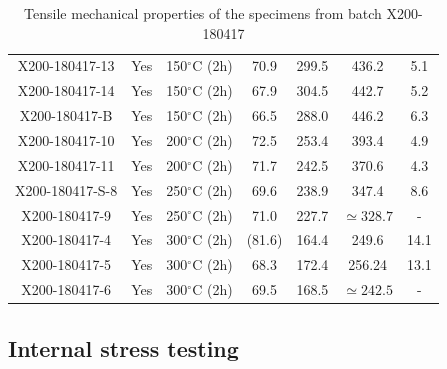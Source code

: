 \begin{center}
\begin{table}[ht]
{\begin{tabular}{|c|c|c |c |c| c|c|}
    X200-180417-13 & Yes & 150$^\circ$C (2h) & 70.9  & 299.5 & 436.2 & 5.1  \\    
    X200-180417-14 & Yes & 150$^\circ$C (2h) & 67.9 & 304.5  &442.7  & 5.2  \\    
    X200-180417-B & Yes & 150$^\circ$C (2h) & 66.5 & 288.0  & 446.2 &6.3  \\    
    X200-180417-10 & Yes & 200$^\circ$C (2h) &72.5  &253.4  & 393.4  &4.9  \\    
    X200-180417-11 & Yes & 200$^\circ$C (2h) &71.7  &242.5  &370.6  &4.3  \\    
    X200-180417-S-8 & Yes& 250$^\circ$C (2h) & 69.6 & 238.9 & 347.4 & 8.6 \\
    X200-180417-9 & Yes& 250$^\circ$C (2h) & 71.0 & 227.7 &$\simeq 328.7$ & - \\
    X200-180417-4 & Yes& 300$^\circ$C (2h) & (81.6) & 164.4 & 249.6 & 14.1 \\ 
    X200-180417-5 & Yes& 300$^\circ$C (2h) & 68.3 &172.4 & 256.24 & 13.1 \\
    X200-180417-6 & Yes& 300$^\circ$C (2h) & 69.5 &168.5 & $\simeq 242.5$ & - \\

\hline
\end{tabular}}

\caption[Tensile mechanical properties of the specimens from batch X200-180417]{Tensile mechanical properties of the specimens from batch X200-180417}
\label{tab:pol}
\end{table}
 \end{center}
 
\subsection{Internal stress testing}





